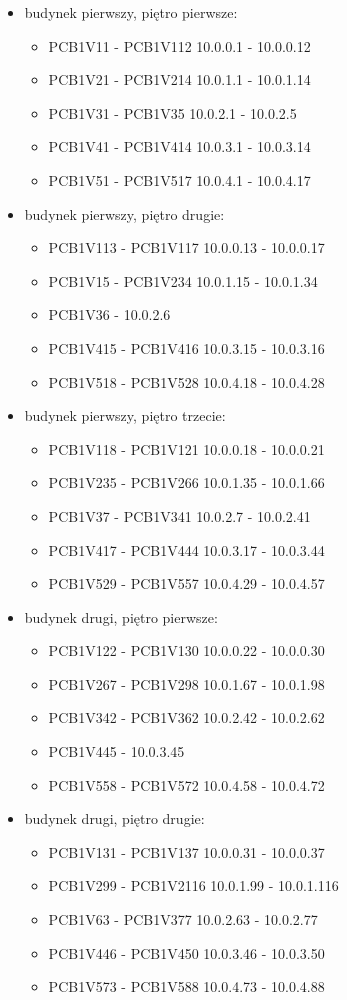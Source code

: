 \documentclass[a4paper, 12pt]{article}
\begin{document}
\begin{itemize}
\item budynek pierwszy, piętro pierwsze:
	\begin{itemize}
	\item PCB1V11 - PCB1V112 10.0.0.1 - 10.0.0.12
	\item PCB1V21 - PCB1V214 10.0.1.1 - 10.0.1.14
	\item PCB1V31 - PCB1V35 10.0.2.1 - 10.0.2.5
	\item PCB1V41 - PCB1V414 10.0.3.1 - 10.0.3.14
	\item PCB1V51 - PCB1V517 10.0.4.1 - 10.0.4.17
	\end{itemize}
\item budynek pierwszy, piętro drugie:
	\begin{itemize}
	\item PCB1V113 - PCB1V117 10.0.0.13 - 10.0.0.17
	\item PCB1V15 - PCB1V234 10.0.1.15 - 10.0.1.34
	\item PCB1V36 - 10.0.2.6
	\item PCB1V415 - PCB1V416 10.0.3.15 - 10.0.3.16
	\item PCB1V518 - PCB1V528 10.0.4.18 - 10.0.4.28
	\end{itemize}
\item budynek pierwszy, piętro trzecie:
	\begin{itemize}
	\item PCB1V118 - PCB1V121 10.0.0.18 - 10.0.0.21
	\item PCB1V235 - PCB1V266 10.0.1.35 - 10.0.1.66
	\item PCB1V37 - PCB1V341 10.0.2.7 - 10.0.2.41
	\item PCB1V417 - PCB1V444 10.0.3.17 - 10.0.3.44
	\item PCB1V529 - PCB1V557 10.0.4.29 - 10.0.4.57
	\end{itemize}
\item budynek drugi, piętro pierwsze:
	\begin{itemize}
	\item PCB1V122 - PCB1V130 10.0.0.22 - 10.0.0.30
	\item PCB1V267 - PCB1V298 10.0.1.67 - 10.0.1.98
	\item PCB1V342 - PCB1V362 10.0.2.42 - 10.0.2.62
	\item PCB1V445 - 10.0.3.45
	\item PCB1V558 - PCB1V572 10.0.4.58 - 10.0.4.72
	\end{itemize}
\item budynek drugi, piętro drugie:
	\begin{itemize}
	\item PCB1V131 - PCB1V137 10.0.0.31 - 10.0.0.37
	\item PCB1V299 - PCB1V2116 10.0.1.99 - 10.0.1.116
	\item PCB1V63 - PCB1V377 10.0.2.63 - 10.0.2.77
	\item PCB1V446 - PCB1V450 10.0.3.46 - 10.0.3.50
	\item PCB1V573 - PCB1V588 10.0.4.73 - 10.0.4.88
	\end{itemize}
\end{itemize}
\end{document}
